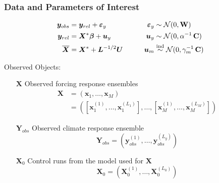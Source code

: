 \documentclass{beamer}
\newcommand{\C}{\ensuremath{\text{Cov}}}
\def\*#1{\bm{#1}}
\def\C{\textbf{\text{C}}}
\def\W{\textbf{\text{W}}}
\begin{document}
\begin{frame}
\frametitle{Data and Parameters of Interest}

\begin{block}{}
\vspace*{-\baselineskip}\setlength\belowdisplayshortskip{0pt}
\begin{alignat*}{3}
\*y_{obs} &= \*y_{rel} + \*\varepsilon_y  \qquad \quad &\*\varepsilon_y &\sim \mathcal N(0,\W)\\
\*y_{rel} &= \*X^* \*\beta + \*u_y \nonumber  \qquad  &\*u_y &\sim \mathcal N(0,\alpha^{-1}\,\C) \\
\overline{\*X} &= \*X^* + \*L^{-1/2} \*U \qquad    &\*u_m &\stackrel{\text{ind}}{\sim} \mathcal N(0,\gamma_m^{-1} \, \C)  \:
\end{alignat*}
\end{block}

\alert{Observed Objects:}

\begin{itemize}
\item[$\*X$] Observed forcing response ensembles
\begin{align*}
\*X &= (\*x_1, \dots, \*x_M)\\
&=([\*x_1^{(1)}, \dots, \*x_1^{(L_1)}], \dots, [\*x_M^{(1)}, \dots, \*x_M^{(L_M)}])
\end{align*}
\item[$\*Y_{obs}$] Observed climate response ensemble
\[
\*Y_{obs} = (\*y_{obs}^{(1)}, \dots, \*y_{obs}^{(L_y)})
\]
\item[$\*X_0$] Control runs from the model used for $\*X$
\[
\*X_0 = (\*X_0^{(1)}, \dots, \*X_0^{(L_0)})
\]
\end{itemize}

\end{frame}
\end{document}
